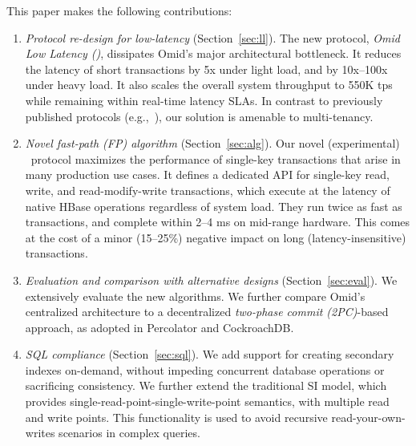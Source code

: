 This paper makes the following contributions: 
\begin{enumerate}
    \setlength{\itemsep}{1pt}
    \setlength{\parskip}{1pt}
    \setlength{\parsep}{1pt}  

\item {\em Protocol re-design for low-latency} (Section~\ref{sec:ll}). 
The new protocol,    \emph{Omid Low Latency (\sysll)}, 
dissipates Omid's major architectural bottleneck. 
It reduces the latency of short transactions by 5x under light load, and 
by 10x--100x under heavy load. %
It also scales 
the overall system throughput to 550K tps while remaining 
within real-time latency SLAs. In contrast to previously published protocols 
(e.g.,~\cite{Percolator2010}), our solution is amenable to multi-tenancy.

\item {\em Novel fast-path (FP) algorithm} (Section~\ref{sec:alg}). 
Our  novel (experimental) \sys\ protocol  
maximizes the performance of  single-key transactions
that arise in many production use cases. 
It defines a dedicated API for single-key read, 
write, and read-modify-write transactions, which execute at the 
latency of native HBase operations regardless of system load.
They run twice as fast as \sysll\/ transactions, and complete within 2--4 ms on mid-range hardware. 
This comes at the cost of a minor (15--25\%) negative impact on long (latency-insensitive) transactions.  

\item \emph{Evaluation and comparison with alternative designs} (Section~\ref{sec:eval}).
We extensively evaluate the new algorithms. %
We further compare Omid's  centralized architecture  to 
a decentralized \emph{two-phase commit (2PC)}-based approach, as 
 adopted in Percolator and CockroachDB.

\item {\em SQL compliance} (Section~\ref{sec:sql}). 
We add support for creating secondary indexes on-demand, 
without impeding concurrent database operations or sacrificing consistency. 
We further extend the traditional SI model, which provides single-read-point-single-write-point semantics, with multiple read and write points. This functionality is used to avoid recursive read-your-own-writes scenarios in complex queries. 

\end{enumerate}

